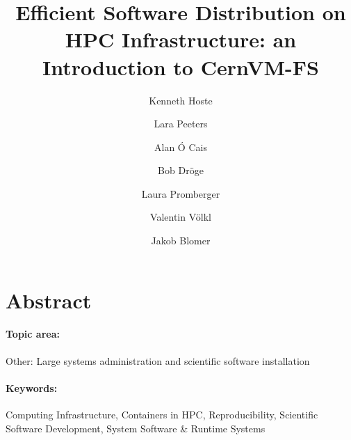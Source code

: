 \documentclass[a4paper,11pt]{article}
\begin{document}

\title{
    \textbf{\LARGE Efficient Software Distribution on HPC Infrastructure: an Introduction to CernVM-FS}\\
}

\date{}

\author[1]{Kenneth Hoste}
\author[1]{Lara Peeters}
\author[2]{Alan \'O Cais}
\author[3]{Bob Dr\"oge}
\author[4]{Laura Promberger}
\author[4]{Valentin V\"olkl}
\author[4]{Jakob Blomer}

\renewcommand\Authands{ and }

\maketitle


\section*{Abstract}


\paragraph{Topic area:} Other: Large systems administration and scientific software installation

\paragraph{Keywords:} Computing Infrastructure, Containers in HPC, Reproducibility, Scientific Software Development, System Software \& Runtime Systems



\newpage
 
\end{document}
